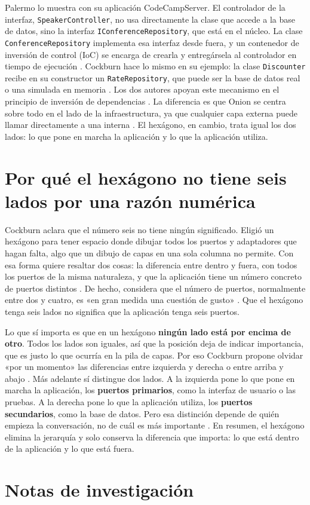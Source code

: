 \begin{sloppypar}
Palermo lo muestra con su aplicación CodeCampServer. El controlador de la interfaz, \texttt{SpeakerController}, no usa directamente la clase que accede a la base de datos, sino la interfaz \texttt{IConferenceRepository}, que está en el núcleo. La clase \texttt{ConferenceRepository} implementa esa interfaz desde fuera, y un contenedor de inversión de control (IoC) se encarga de crearla y entregársela al controlador en tiempo de ejecución \citep{palermo2008b}. Cockburn hace lo mismo en su ejemplo: la clase \texttt{Discounter} recibe en su constructor un \texttt{RateRepository}, que puede ser la base de datos real o una simulada en memoria \citep[«Sample Code»]{cockburn2005}. Los dos autores apoyan este mecanismo en el principio de inversión de dependencias \parencites{palermo2008}[«Related Patterns»]{cockburn2005}. La diferencia es que Onion se centra sobre todo en el lado de la infraestructura, ya que cualquier capa externa puede llamar directamente a una interna \citep{palermo2008c}. El hexágono, en cambio, trata igual los dos lados: lo que pone en marcha la aplicación y lo que la aplicación utiliza.
\end{sloppypar}


\section{Por qué el hexágono no tiene seis lados por una razón numérica}

Cockburn aclara que el número seis no tiene ningún significado. Eligió un hexágono para tener espacio donde dibujar todos los puertos y adaptadores que hagan falta, algo que un dibujo de capas en una sola columna no permite. Con esa forma quiere resaltar dos cosas: la diferencia entre dentro y fuera, con todos los puertos de la misma naturaleza, y que la aplicación tiene un número concreto de puertos distintos \citep[«Nature of the Solution»]{cockburn2005}. De hecho, considera que el número de puertos, normalmente entre dos y cuatro, es «en gran medida una cuestión de gusto» \citep[«How Many Ports?»]{cockburn2005}. Que el hexágono tenga seis lados no significa que la aplicación tenga seis puertos.

Lo que sí importa es que en un hexágono \textbf{ningún lado está por encima de otro}. Todos los lados son iguales, así que la posición deja de indicar importancia, que es justo lo que ocurría en la pila de capas. Por eso Cockburn propone olvidar «por un momento» las diferencias entre izquierda y derecha o entre arriba y abajo \citep[«Nature of the Solution»]{cockburn2005}. Más adelante sí distingue dos lados. A la izquierda pone lo que pone en marcha la aplicación, los \textbf{puertos primarios}, como la interfaz de usuario o las pruebas. A la derecha pone lo que la aplicación utiliza, los \textbf{puertos secundarios}, como la base de datos. Pero esa distinción depende de quién empieza la conversación, no de cuál es más importante \citep[«The Left-Right Asymmetry»]{cockburn2005}. En resumen, el hexágono elimina la jerarquía y solo conserva la diferencia que importa: lo que está dentro de la aplicación y lo que está fuera.



\section*{Notas de investigación}

